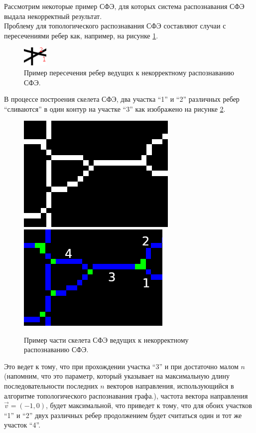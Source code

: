 \documentclass[makeidx, a4paper, 14pt]{extarticle}
\begin{document}
Рассмотрим некоторые пример СФЭ, для которых система распознавания СФЭ выдала некорректный результат. \\

Проблему для топологического распознавания СФЭ составляют случаи с пересечениями ребер как, например, на рисунке \ref{fig:bad_recognition}.

\begin{figure}[H]
    \centering
    \includegraphics[scale=5.5]{bad_recognition.png}
    \caption{Пример пересечения ребер ведущих к некорректному распознаванию СФЭ.}
    \label{fig:bad_recognition}
\end{figure}

В процессе построения скелета СФЭ, два участка ``1'' и ``2'' различных ребер ``сливаются'' в один контур на участке ``3'' как изображено на рисунке \ref{fig:bad_recognition_skelet}.

\begin{figure}[H]
    \centering
    \includegraphics[scale=1]{bad_recognition_skelet.png}
    \includegraphics[scale=1.1]{bad_recognition_classified.png}
    \caption{Пример части скелета СФЭ ведущих к некорректному распознаванию СФЭ.}
    \label{fig:bad_recognition_skelet}
\end{figure}

Это ведет к тому, что при прохождении участка ``3'' и при достаточно малом $n$ (напомним, что это параметр, который указывает на максимальную длину последовательности последних $n$ векторов направления,
использующийся в алгоритме топологического распознавания графа.), частота вектора направления $\vec{v}=(-1, 0)$, будет максимальной,
что приведет к тому, что для обоих участков ``1'' и ``2'' двух различных ребер продолжением будет считаться один и тот же участок ``4''.
\end{document}
